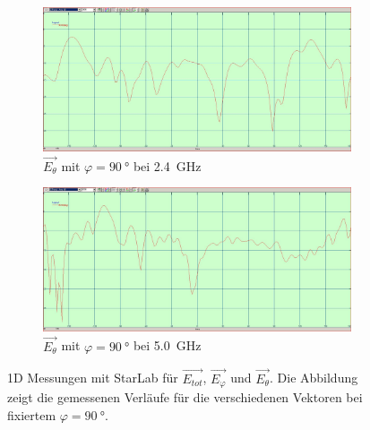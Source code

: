 \begin{figure}[h!]
	\begin{subfigure}[b]{0.48\textwidth}
		\includegraphics[width=1\textwidth]{../fig/plt/2G4_90phi_etheta_amp_dB.JPG}
		\caption{$\vec{E_{\theta}}$ mit $\varphi=\SI{90}{\degree}$ bei \SI{2.4}{\giga\hertz}}
	\end{subfigure}
	\begin{subfigure}[b]{0.48\textwidth}
		\includegraphics[width=1\textwidth]{../fig/plt/5G0_90phi_etheta_amp_dB.JPG}
		\caption{$\vec{E_{\theta}}$ mit $\varphi=\SI{90}{\degree}$ bei \SI{5.0}{\giga\hertz}}
	\end{subfigure}
	\caption[1D Messungen mit StarLab für $\vec{E_{tot}}$, $\vec{E_{\varphi}}$ und $\vec{E_{\theta}}$]{
		1D Messungen mit StarLab für $\vec{E_{tot}}$, $\vec{E_{\varphi}}$ und $\vec{E_{\theta}}$.
		Die Abbildung zeigt die gemessenen Verläufe für die
		verschiedenen Vektoren bei fixiertem
		$\varphi = \SI{90}{\degree}$.}
\end{figure}



